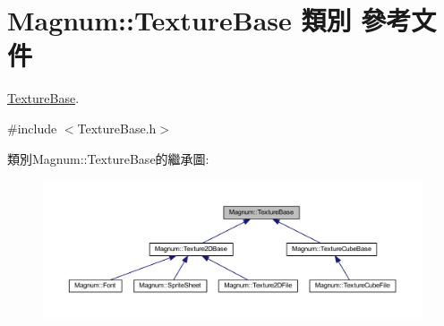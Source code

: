 \hypertarget{class_magnum_1_1_texture_base}{}\section{Magnum\+:\+:Texture\+Base 類別 參考文件}
\label{class_magnum_1_1_texture_base}


\hyperlink{class_magnum_1_1_texture_base}{Texture\+Base}.  




{\ttfamily \#include $<$Texture\+Base.\+h$>$}



類別\+Magnum\+:\+:Texture\+Base的繼承圖\+:\nopagebreak
\begin{figure}[H]
\begin{center}
\leavevmode
\includegraphics[width=350pt]{class_magnum_1_1_texture_base__inherit__graph}
\end{center}
\end{figure}
